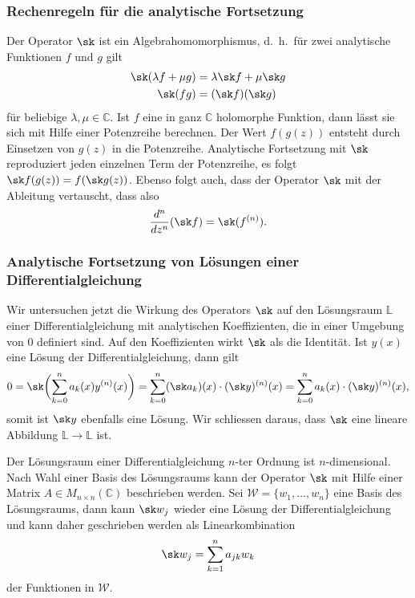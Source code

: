 \subsubsection{Rechenregeln für die analytische Fortsetzung}
Der Operator $\sk$ ist ein Algebrahomomorphismus, d.~h.~für zwei analytische
Funktionen $f$ und $g$ gilt
\[
\begin{aligned}
\sk(\lambda f + \mu g)
&=
\lambda \sk f  + \mu \sk g
\\
\sk(fg)
&=
(\sk f)(\sk g)
\end{aligned}
\]
für beliebige $\lambda,\mu\in\mathbb{C}$.
Ist $f$ eine in ganz $\mathbb{C}$ holomorphe Funktion, dann lässt sie
sich mit Hilfe einer Potenzreihe berechnen.
Der Wert $f(g(z))$ entsteht durch Einsetzen von $g(z)$ in die Potenzreihe.
Analytische Fortsetzung mit $\sk$ reproduziert jeden einzelnen Term
der Potenzreihe, es folgt
$\sk f(g(z)) = f(\sk g(z))$.
Ebenso folgt auch, dass der Operator $\sk$ mit der Ableitung
vertauscht, dass also
\[
\frac{d^n}{dz^n}(\sk f)
=
\sk(f^{(n)}).
\]

%
%
\subsubsection{Analytische Fortsetzung von Lösungen einer Differentialgleichung}
Wir untersuchen jetzt die Wirkung des Operators $\sk$ auf
den Lösungsraum $\mathbb{L}$ einer Differentialgleichung mit
analytischen Koeffizienten, die in einer Umgebung von $0$
definiert sind.
Auf den Koeffizienten wirkt $\sk$ als die Identität. 
Ist $y(x)$ eine Lösung der Differentialgleichung, dann gilt
\[
0
=
\sk\biggl(
\sum_{k=0}^n a_k(x) y^{(n)}(x)
\biggr)
=
\sum_{k=0}^n (\sk a_k)(x) \cdot (\sk y)^{(n)}(x)
=
\sum_{k=0}^n a_k(x) \cdot (\sk y)^{(n)}(x),
\]
somit ist $\sk y$ ebenfalls eine Lösung.
Wir schliessen daraus, dass $\sk$ eine lineare Abbildung 
$\mathbb{L}\to\mathbb{L}$ ist.

Der Lösungsraum einer Differentialgleichung $n$-ter Ordnung
ist $n$-dimensional.
Nach Wahl einer Basis des Lösungsraums kann der Operator $\sk$
mit Hilfe einer Matrix $A\in M_{n\times n}(\mathbb{C})$ beschrieben werden.
Sei $\mathscr{W}=\{w_1,\dots,w_n\}$ eine Basis des Lösungsraums, dann
kann $\sk w_j$ wieder eine Lösung der Differentialgleichung
und kann daher geschrieben werden als Linearkombination
\begin{equation}
\sk w_j
=
\sum_{k=1}^n
a_{jk} w_k
\end{equation}
der Funktionen in $\mathscr{W}$.


